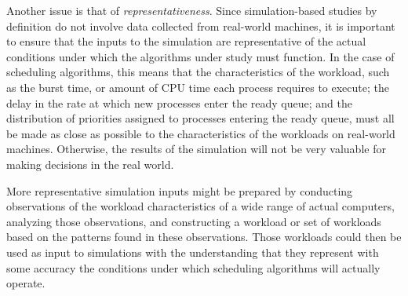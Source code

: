 \documentclass[12pt,letterpaper]{article}
\begin{document}
  			Another issue is that of \textit{representativeness}. Since  simulation-based studies by definition do not involve data collected from real-world machines, it is important to ensure that the inputs to the simulation are representative of the actual conditions under which the algorithms under study must function. In the case of scheduling algorithms, this means that the characteristics of the workload, such as the burst time, or amount of CPU time each process requires to execute; the delay in the rate at which new processes enter the ready queue; and the distribution of priorities assigned to processes entering the ready queue, must all be made as close as possible to the characteristics of the workloads on real-world machines. Otherwise, the results of the simulation will not be very valuable for making decisions in the real world.

  			More representative simulation inputs might be prepared by conducting observations of the workload characteristics of a wide range of actual computers, analyzing those observations, and constructing a workload or set of workloads based on the patterns found in these observations. Those workloads could then be used as input to simulations with the understanding that they represent with some accuracy the conditions under which scheduling algorithms will actually operate.
\end{document}
